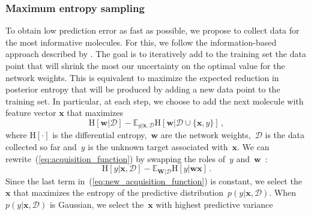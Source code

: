 \subsubsection{Maximum entropy sampling}

To obtain low prediction error as fast as possible, we propose to collect data for the most informative molecules. For this, we follow the information-based approach described by \cite{MacKay_1992}. The goal is to iteratively add to the training set the data point that will shrink the most our uncertainty on the optimal value for the network weights. This is equivalent to maximize the expected reduction in posterior entropy that will be produced by adding a new data point to the training set. In particular, at each step, we choose to add the next molecule with feature vector $\mathbf{x}$ that maximizes
\begin{equation}
\text{H}[\mathbf{w}|\mathcal{D}] - 
\mathbb{E}_{y|\mathbf{x},\mathcal{D}}\text{H}[\mathbf{w}|\mathcal{D}\cup\{\mathbf{x},y\}]\,,\label{eq:acquisition_function}
\end{equation}
where $\text{H}[\cdot]$ is the differential entropy,~$\mathbf{w}$ are the network weights,~$\mathcal{D}$ is the data collected so far and~$y$ is the unknown target associated with~$\mathbf{x}$. We can rewrite~(\ref{eq:acquisition_function}) by swapping the roles of~$y$ and~$\mathbf{w}$~\cite{houlsby2012collaborative}:
\begin{equation}
\text{H}[y | \mathbf{x},\mathcal{D}] - 
\mathbb{E}_{\mathbf{W} | \mathcal{D}}\text{H}[y | \mathbf{w}\mathbf{x}]\,.\label{eq:new_acquisition_function}
\end{equation}
Since the last term in~(\ref{eq:new_acquisition_function}) is constant, we select the~$\mathbf{x}$ that maximizes the entropy of the predictive distribution~$p(y| \mathbf{x},\mathcal{D})$. When $p(y| \mathbf{x},\mathcal{D})$ is Gaussian, we select the~$\mathbf{x}$ with highest predictive variance